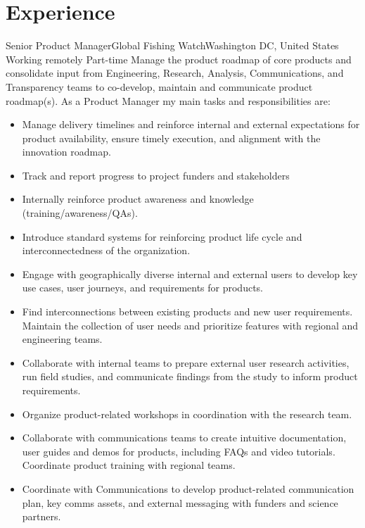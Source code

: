 \documentclass[11pt,a4paper,sans]{moderncv}
\begin{document}
\section{Experience}
 {Senior Product Manager}{Global Fishing Watch}{Washington DC, United States \- Working remotely \- Part-time }{}
{
  Manage the product roadmap of core products and consolidate input from Engineering, Research, Analysis, Communications, and Transparency teams to co-develop, maintain and communicate product roadmap(s).
  \newline{}
}
{
  As a Product Manager my main tasks and responsibilities are:
}
\begin{itemize}
  \item Manage delivery timelines and reinforce internal and external expectations for product availability, ensure timely execution, and alignment with the innovation roadmap.
  \item Track and report progress to project funders and stakeholders
  \item Internally reinforce product awareness and knowledge (training/awareness/QAs).
  \item Introduce standard systems for reinforcing product life cycle and interconnectedness of the organization.
  \item Engage with geographically diverse internal and external users to develop key use cases, user journeys, and requirements for products.
  \item Find interconnections between existing products and new user requirements. Maintain the collection of user needs and prioritize features with regional and engineering teams.
  \item Collaborate with internal teams to prepare external user research activities, run field studies, and communicate findings from the study to inform product requirements.
  \item Organize product-related workshops in coordination with the research team.
  \item Collaborate with communications teams to create intuitive documentation, user guides and demos for products, including FAQs and video tutorials. Coordinate product training with regional teams.
  \item Coordinate with Communications to develop product-related communication plan, key comms assets, and external messaging with funders and science partners.
\newline{}
\end{itemize}
\end{document}
